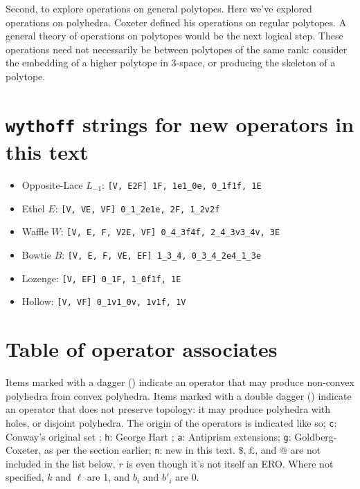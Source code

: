 \documentclass{amsart}[12pt]
\begin{document}
Second, to explore operations on general polytopes. Here we've explored
operations on polyhedra. Coxeter defined his operations on regular polytopes.
A general theory of operations on polytopes would be the next logical step.
These operations need not necessarily be between polytopes of the same rank:
consider the embedding of a higher polytope in 3-space, or producing the
skeleton of a polytope.




\appendix
\section{\texttt{wythoff} strings for new operators in this text}
\begin{itemize}
  \item Opposite-Lace $L_{-1}$: \texttt{[V, E2F] 1F, 1e1\_0e, 0\_1f1f, 1E}
  \item Ethel $E$: \texttt{[V, VE, VF] 0\_1\_2e1e, 2F, 1\_2v2f}
  \item Waffle $W$: \texttt{[V, E, F, V2E, VF] 0\_4\_3f4f, 2\_4\_3v3\_4v, 3E}
  \item Bowtie $B$: \texttt{[V, E, F, VE, EF] 1\_3\_4, 0\_3\_4\_2e4\_1\_3e}
  \item Lozenge: \texttt{[V, EF] 0\_1F, 1\_0f1f, 1E}
  \item Hollow: \texttt{[V, VF] 0\_1v1\_0v, 1v1f, 1V}
\end{itemize}

\section{Table of operator associates}

Items marked with a dagger (\dag) indicate an operator that may produce
non-convex polyhedra from convex polyhedra. Items marked with a
double dagger (\ddag) indicate an operator that does not preserve topology:
it may produce polyhedra with holes, or disjoint polyhedra.
The origin of the operators is indicated like so;
\texttt{c}: Conway's original set \cite{conway};
\texttt{h}: George Hart \cite{hart00}\cite{hart98};
\texttt{a}: Antiprism extensions\cite{antiprism};
\texttt{g}: Goldberg-Coxeter, as per the section earlier;
\texttt{n}: new in this text.
$\$, \pounds$, and $@$ are not included in the list below. $r$ is even though
it's not itself an ERO. Where not specified, $k$ and $\ell$ are 1, and $b_i$
and $b'_i$ are 0.
\end{document}
